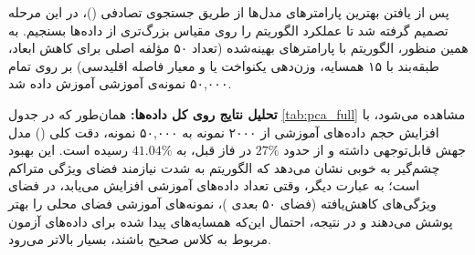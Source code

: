 \documentclass{article}
\begin{document}
پس از یافتن بهترین پارامترهای مدل‌ها از طریق جستجوی تصادفی ()، در این مرحله تصمیم گرفته شد تا عملکرد الگوریتم را روی مقیاس بزرگ‌تری از داده‌ها بسنجیم. به همین منظور، الگوریتم  با پارامترهای بهینه‌شده (تعداد ۵۰ مؤلفه اصلی برای کاهش ابعاد، طبقه‌بند  با ۱۵ همسایه، وزن‌دهی یکنواخت یا  و معیار فاصله اقلیدسی) بر روی تمام ۵۰,۰۰۰ نمونه‌ی آموزشی  آموزش داده شد. 

\textbf{تحلیل نتایج  روی کل داده‌ها:}
همان‌طور که در جدول \ref{tab:pca_full} مشاهده می‌شود، با افزایش حجم داده‌های آموزشی از ۲۰۰۰ نمونه به ۵۰,۰۰۰ نمونه، دقت کلی () مدل جهش قابل‌توجهی داشته و از حدود $27\%$ در فاز قبل، به $41.04\%$ رسیده است. این بهبود چشم‌گیر به خوبی نشان می‌دهد که الگوریتم  به شدت نیازمند فضای ویژگی متراکم است؛ به عبارت دیگر، وقتی تعداد داده‌های آموزشی افزایش می‌یابد، در فضای ویژگی‌های کاهش‌یافته (فضای ۵۰ بعدی )، نمونه‌های آموزشی فضای محلی را بهتر پوشش می‌دهند و در نتیجه، احتمال این‌که همسایه‌های پیدا شده برای داده‌های آزمون مربوط به کلاس صحیح باشند، بسیار بالاتر می‌رود. 
\end{document}
